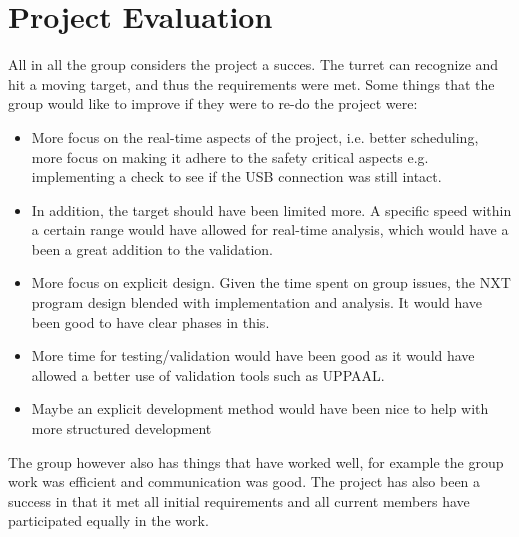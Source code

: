 \section{Project Evaluation}
All in all the group considers the project a succes. The turret can recognize and hit a moving target, and thus the requirements were met. Some things that the group would like to improve if they were to re-do the project were:
\begin{itemize}
	\item More focus on the real-time aspects of the project, i.e. better scheduling, more focus on making it adhere to the safety critical aspects e.g. implementing a check to see if the USB connection was still intact.
	\item In addition, the target should have been limited more. A specific speed within a certain range would have allowed for real-time analysis, which would have a been a great addition to the validation.
	\item More focus on explicit design. Given the time spent on group issues, the NXT program design blended with implementation and analysis. It would have been good to have clear phases in this.
	\item More time for testing/validation would have been good as it would have allowed a better use of validation tools such as UPPAAL.
	\item Maybe an explicit development method would have been nice to help with more structured development
\end{itemize}

The group however also has things that have worked well, for example the group work was efficient and communication was good. The project has also been a success in that it met all initial requirements and all current members have participated equally in the work.
